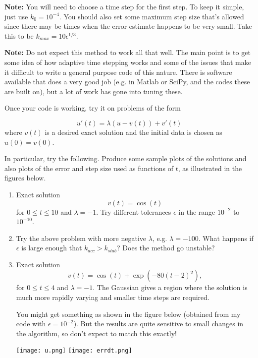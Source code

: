\documentclass[10pt]{article}
\begin{document}
{\bf Note:} You will need to choose a time step for the first step.  To keep
it simple, just use $k_0 = 10^{-4}$.   You should also set some maximum
step size that's allowed since there may be times when the error estimate
happens to be very small.  Take this to be $k_{max} = 10 \epsilon^{1/3}$.

{\bf Note:} Do not expect this method to work all that well.  The main point
is to get some idea of how adaptive time stepping works and some of the
issues that make it difficult to write a general purpose code of this
nature.  There is software available that does a very good job (e.g. in
Matlab or SciPy, and the codes these are built on), but a lot of
work has gone into tuning these.


Once your code is working, try it on problems of the form

\begin{equation}\label{fuv}
u'(t) = \lambda (u - v(t)) + v'(t)
\end{equation} 
where $v(t)$ is a desired exact solution and the initial data is chosen as 
$u(0) = v(0)$.

In particular, try the following.  Produce some sample plots of the
solutions and also plots of the error and step size used as functions of
$t$, as illustrated in the figures below.

\begin{enumerate} 
\item  Exact solution
\[
v(t) = \cos(t) 
\]
for $0\leq t \leq 10$ and $\lambda = -1$. Try different tolerances
$\epsilon$ in the range $10^{-2}$ to $10^{-10}$.

\item
Try the above problem with more negative $\lambda$, e.g. $\lambda=-100$.
What happens if $\epsilon$ is large enough that $k_{acc} > k_{stab}$?  Does
the method go unstable?


\item  Exact solution
\[
v(t) = \cos(t) + \exp\left(-80(t-2)^2\right),
\]
for $0\leq t \leq 4$ and $\lambda = -1$. The Gaussian gives a region where the
solution is much more rapidly varying and smaller time steps are required. 

You might get something as shown in the figure below
(obtained from my code with $\epsilon = 10^{-2}$).   
But the results are quite sensitive to small changes in the algorithm, so
don't expect to match this exactly!

\vskip 5pt
\hfil\texttt{[image: u.png]}\hfil
\vskip 5pt
\hfil\texttt{[image: errdt.png]}\hfil
\vskip 5pt



\end{enumerate} 





\end{document}
